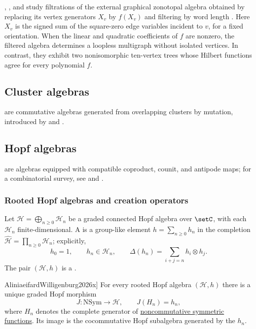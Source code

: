, , and 
study filtrations of the external graphical zonotopal algebra obtained by
replacing its vertex generators $X_v$ by $f(X_v)$ and filtering by word
length \cite{ShapiroSmirnovVaintrob2026x}. Here $X_v$ is the signed sum
of the square-zero edge variables incident to $v$, for a fixed orientation.
When the linear and quadratic
coefficients of $f$ are nonzero, the filtered algebra determines a loopless
multigraph without isolated vertices. In contrast, they exhibit two
nonisomorphic ten-vertex trees whose Hilbert functions agree for every
polynomial $f$.

\subsection[clusterAlgebra]{Cluster algebras}

\label{clusterAlgebraDefinition} are commutative
algebras generated from overlapping clusters by mutation, introduced by
 and  \cite{FominZelevinsky2002}.

\subsection[hopfAlgebra]{Hopf algebras}

\label{hopfAlgebraDefinition} are algebras equipped with
compatible coproduct, counit, and antipode maps; for a combinatorial survey,
see  and  \cite{GrinbergReiner2014Hopf}.

\subsubsection[rootedHopfAlgebra]{Rooted Hopf algebras and creation operators}

Let $\mathcal H=\bigoplus_{n\geq0}\mathcal H_n$ be a graded connected Hopf algebra over
$\setC$, with each $\mathcal H_n$ finite-dimensional. A  is a
group-like element $h=\sum_{n\geq0}h_n$ in the completion
$\widehat{\mathcal H}=\prod_{n\geq0}\mathcal H_n$; explicitly,
\[
 h_0=1,\qquad h_n\in\mathcal H_n,\qquad
 \Delta(h_n)=\sum_{i+j=n}h_i\otimes h_j.
\]
The pair $(\mathcal H,h)$ is a .

\begin{theorem}[\cite[Thm.~3.2]{AliniaeifardWilligenburg2026x}]
For every rooted Hopf algebra $(\mathcal H,h)$ there is a unique graded Hopf morphism
\[
 J:\mathrm{NSym}\longrightarrow\mathcal H,\qquad J(H_n)=h_n,
\]
where $H_n$ denotes the complete generator of
\hyperref[nonComFunctions]{noncommutative symmetric functions}.
Its image is the cocommutative Hopf subalgebra generated by the $h_n$.
\end{theorem}

